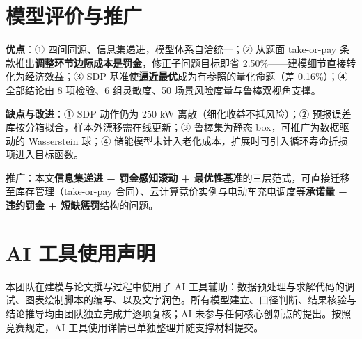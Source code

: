 \documentclass[11pt,a4paper]{ctexart}
\begin{document}
\section{模型评价与推广}

\textbf{优点}：① 四问同源、信息集递进，模型体系自洽统一；② 从题面 take-or-pay 条款推出\textbf{调整环节边际成本是罚金}，修正子问题目标即省 2.50\%——建模细节直接转化为经济效益；③ SDP 基准使\textbf{逼近最优}成为有参照的量化命题（差 0.16\%）；④ 全部结论由 8 项检验、6 组灵敏度、50 场景风险度量与鲁棒双视角支撑。

\textbf{缺点与改进}：① SDP 动作仍为 250 kW 离散（细化收益不抵风险）；② 预报误差库按分箱拟合，样本外漂移需在线更新；③ 鲁棒集为静态 box，可推广为数据驱动的 Wasserstein 球；④ 储能模型未计入老化成本，扩展时可引入循环寿命折损项进入目标函数。

\textbf{推广}：本文\textbf{信息集递进 + 罚金感知滚动 + 最优性基准}的三层范式，可直接迁移至库存管理（take-or-pay 合同）、云计算竞价实例与电动车充电调度等\textbf{承诺量 + 违约罚金 + 短缺惩罚}结构的问题。

\section*{AI 工具使用声明}
本团队在建模与论文撰写过程中使用了 AI 工具辅助：数据预处理与求解代码的调试、图表绘制脚本的编写、以及文字润色。所有模型建立、口径判断、结果核验与结论推导均由团队独立完成并逐项复核；AI 未参与任何核心创新点的提出。按照竞赛规定，AI 工具使用详情已单独整理并随支撑材料提交。
\end{document}
